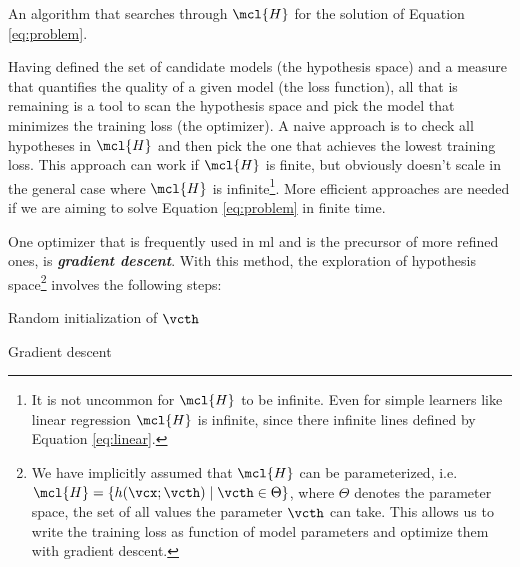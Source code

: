 \begin{definition}[Optimizer]
	An algorithm that searches through $\mcl{H}$ for the solution of Equation
	\ref{eq:problem}.
\end{definition}

Having defined the set of candidate models (the hypothesis space) and a measure
that quantifies the quality of a given model (the loss function), all that is
remaining is a tool to scan the hypothesis space and pick the model that
minimizes the training loss (the optimizer). A naive approach is to check all
hypotheses in $\mcl{H}$ and then pick the one that achieves the lowest training
loss. This approach can work if $\mcl{H}$ is finite, but obviously doesn't scale
in the general case where $\mcl{H}$ is infinite\footnote{It is not
uncommon for $\mcl{H}$ to be infinite. Even for simple learners like linear
regression $\mcl{H}$ is infinite, since there infinite lines defined by Equation
\ref{eq:linear}.}. More efficient approaches are needed if we are aiming to solve
Equation \ref{eq:problem} in finite time.

One optimizer that is frequently used in \gls{ml} and is the precursor of more
refined ones, is \emph{\textbf{gradient descent}}. With
this method, the exploration of hypothesis space\footnote{We have implicitly
assumed that $\mcl{H}$ can be parameterized, i.e. $\mcl{H} = \{h(\vcx;\vcth)
\mid \vcth \in \Theta\}$, where $\Theta$ denotes the parameter space, the set of
all values the parameter $\vcth$ can take. This allows us to write the training
loss as function of model parameters and optimize them with gradient descent.}
involves the following steps:

\begin{algorithm}[H]
	Random initialization of $\vcth$\;
	\caption{Gradient descent}
	\label{algo:gd}
\end{algorithm}

